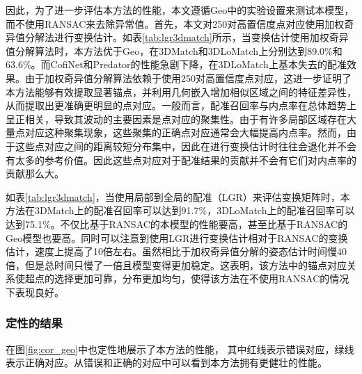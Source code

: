     因此，为了进一步评估本方法的性能，本文遵循Geo中的实验设置来测试本模型，而不使用RANSAC来去除异常值。首先，本文对250对高置信度点对应使用加权奇异值分解法进行变换估计。如表\ref{tab:lgr3dmatch}所示，当变换估计使用加权奇异值分解算法时，本方法优于Geo，在3DMatch和3DLoMatch上分别达到89.0\%和63.6\%。而CofiNet和Predator的性能急剧下降，在3DLoMatch上基本失去的配准效果。由于加权奇异值分解算法依赖于使用250对高置信度点对应，这进一步证明了本方法能够有效提取显著锚点，并利用几何嵌入增加相似区域之间的特征差异性，从而提取出更准确更明显的点对应。一般而言，配准召回率与内点率在总体趋势上呈正相关，导致其波动的主要因素是点对应的聚集性。由于有许多局部区域存在大量点对应这种聚集现象，这些聚集的正确点对应通常会大幅提高内点率。然而，由于这些点对应之间的距离较短分布集中，因此在进行变换估计时往往会退化并不会有太多的参考价值。因此这些点对应对于配准结果的贡献并不会有它们对内点率的贡献那么大。\par

    如表\ref{tab:lgr3dmatch}，当使用局部到全局的配准（LGR）来评估变换矩阵时，本方法在3DMatch上的配准召回率可以达到91.7\%，3DLoMatch上的配准召回率可以达到75.1\%。不仅比基于RANSAC的本模型的性能要高，甚至比基于RANSAC的Geo模型也要高。同时可以注意到使用LGR进行变换估计相对于RANSAC的变换估计，速度上提高了10倍左右。虽然相比于加权奇异值分解的姿态估计时间慢40倍，但是总时间只慢了一倍且模型变得更加稳定。这表明，该方法中的锚点对应关系使超点的选择更加可靠，分布更加均匀，使得该方法在不使用RANSAC的情况下表现良好。

    \vspace{0.1cm}
    

    \subsubsection{定性的结果}
    在图\ref{fig:cor_geo}中也定性地展示了本方法的性能，
    其中红线表示错误对应，绿线表示正确对应。从错误和正确的对应中可以看到本方法拥有更健壮的性能。\par


